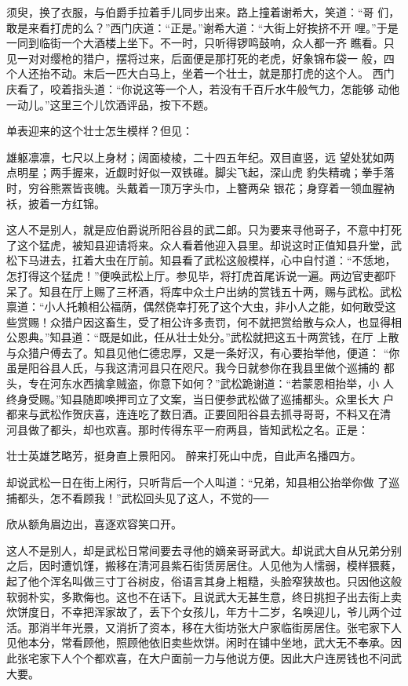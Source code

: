 须臾，换了衣服，与伯爵手拉着手儿同步出来。路上撞着谢希大，笑道：“哥
们，敢是来看打虎的么？”西门庆道：“正是。”谢希大道：“大街上好挨挤不开
哩。”于是一同到临街一个大酒楼上坐下。不一时，只听得锣鸣鼓响，众人都一齐
瞧看。只见一对对缨枪的猎户，摆将过来，后面便是那打死的老虎，好象锦布袋一
般，四个人还抬不动。末后一匹大白马上，坐着一个壮士，就是那打虎的这个人。
西门庆看了，咬着指头道：“你说这等一个人，若没有千百斤水牛般气力，怎能够
动他一动儿。”这里三个儿饮酒评品，按下不题。

单表迎来的这个壮士怎生模样？但见：

雄躯凛凛，七尺以上身材；阔面棱棱，二十四五年纪。双目直竖，远
望处犹如两点明星；两手握来，近觑时好似一双铁碓。脚尖飞起，深山虎
豹失精魂；拳手落时，穷谷熊罴皆丧魄。头戴着一顶万字头巾，上簪两朵
银花；身穿着一领血腥衲袄，披着一方红锦。

这人不是别人，就是应伯爵说所阳谷县的武二郎。只为要来寻他哥子，不意中打死
了这个猛虎，被知县迎请将来。众人看着他迎入县里。却说这时正值知县升堂，武
松下马进去，扛着大虫在厅前。知县看了武松这般模样，心中自忖道：“不恁地，
怎打得这个猛虎！”便唤武松上厅。参见毕，将打虎首尾诉说一遍。两边官吏都吓
呆了。知县在厅上赐了三杯酒，将库中众土户出纳的赏钱五十两，赐与武松。武松
禀道：“小人托赖相公福荫，偶然侥幸打死了这个大虫，非小人之能，如何敢受这
些赏赐！众猎户因这畜生，受了相公许多责罚，何不就把赏给散与众人，也显得相
公恩典。”知县道：“既是如此，任从壮士处分。”武松就把这五十两赏钱，在厅
上散与众猎户傅去了。知县见他仁德忠厚，又是一条好汉，有心要抬举他，便道：
“你虽是阳谷县人氏，与我这清河县只在咫尺。我今日就参你在我县里做个巡捕的
都头，专在河东水西擒拿贼盗，你意下如何？”武松跪谢道：“若蒙恩相抬举，小
人终身受赐。”知县随即唤押司立了文案，当日便参武松做了巡捕都头。众里长大
户都来与武松作贺庆喜，连连吃了数日酒。正要回阳谷县去抓寻哥哥，不料又在清
河县做了都头，却也欢喜。那时传得东平一府两县，皆知武松之名。正是：

壮士英雄艺略芳，挺身直上景阳冈。
醉来打死山中虎，自此声名播四方。

却说武松一日在街上闲行，只听背后一个人叫道：“兄弟，知县相公抬举你做
了巡捕都头，怎不看顾我！”武松回头见了这人，不觉的──

欣从额角眉边出，喜逐欢容笑口开。

这人不是别人，却是武松日常间要去寻他的嫡亲哥哥武大。却说武大自从兄弟分别
之后，因时遭饥馑，搬移在清河县紫石街赁房居住。人见他为人懦弱，模样猥蕤，
起了他个浑名叫做三寸丁谷树皮，俗语言其身上粗糙，头脸窄狭故也。只因他这般
软弱朴实，多欺侮也。这也不在话下。且说武大无甚生意，终日挑担子出去街上卖
炊饼度日，不幸把浑家故了，丢下个女孩儿，年方十二岁，名唤迎儿，爷儿两个过
活。那消半年光景，又消折了资本，移在大街坊张大户家临街房居住。张宅家下人
见他本分，常看顾他，照顾他依旧卖些炊饼。闲时在铺中坐地，武大无不奉承。因
此张宅家下人个个都欢喜，在大户面前一力与他说方便。因此大户连房钱也不问武
大要。

